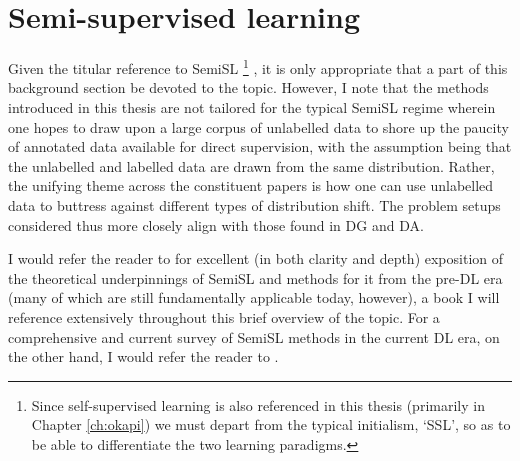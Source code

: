 \section{ Semi-supervised learning }\label{sec:semisl}
%
Given the titular reference to \ac{SemiSL}
%
\footnote{ 
  Since self-supervised learning is also referenced in this thesis (primarily in Chapter
  \ref{ch:okapi}) we must depart from the typical initialism, `SSL', so as to be able to
  differentiate the two learning paradigms.
%
}
%
, it is only appropriate that a part of this background section be devoted to the
topic.
%
However, I note that the methods introduced in this thesis are not tailored for the typical
\ac{SemiSL} regime wherein one hopes to draw upon a large corpus of unlabelled data to shore up the
paucity of annotated data available for direct supervision, with the assumption being that the
unlabelled and labelled data are drawn from the same distribution.
%
Rather, the unifying theme across the constituent papers is how one can use unlabelled data to
buttress against different types of distribution shift.
%
The problem setups considered thus more closely align with those found in \ac{DG} and \ac{DA}. 

I would refer the reader to \cite{chapelle2009semi} for excellent (in both clarity and depth)
exposition of the theoretical underpinnings of \ac{SemiSL} and methods for it from the
pre-\ac{DL} era (many of which are still fundamentally applicable today, however), a book I
will reference extensively throughout this brief overview of the topic.
%
For a comprehensive and current survey of \ac{SemiSL} methods in the current \ac{DL} era, on the
other hand, I would refer the reader to \cite{yang2022survey}.
%

